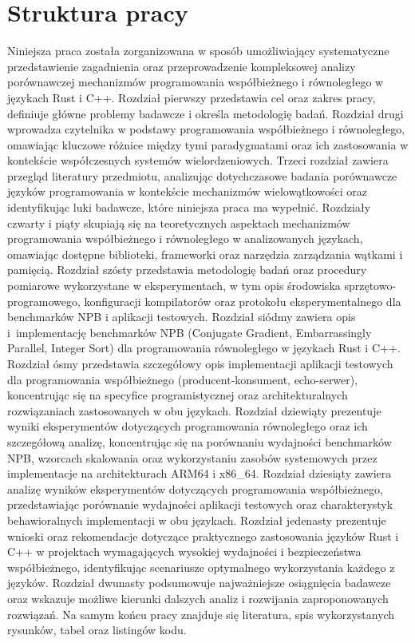 \section{Struktura pracy}
Niniejsza praca została zorganizowana w sposób umożliwiający systematyczne przedstawienie zagadnienia oraz przeprowadzenie kompleksowej analizy porównawczej mechanizmów programowania współbieżnego i równoległego w językach Rust i C++.
Rozdział pierwszy przedstawia cel oraz zakres pracy, definiuje główne problemy badawcze i określa metodologię badań. Rozdział drugi wprowadza czytelnika w podstawy programowania współbieżnego i równoległego, omawiając kluczowe różnice między tymi paradygmatami oraz ich zastosowania w kontekście współczesnych systemów wielordzeniowych. Trzeci rozdział zawiera przegląd literatury przedmiotu, analizując dotychczasowe badania porównawcze języków programowania w kontekście mechanizmów wielowątkowości oraz identyfikując luki badawcze, które niniejsza praca ma wypełnić.
Rozdziały czwarty i piąty skupiają się na teoretycznych aspektach mechanizmów programowania współbieżnego i równoległego w analizowanych językach, omawiając dostępne biblioteki, frameworki oraz narzędzia zarządzania wątkami i pamięcią. Rozdział szósty przedstawia metodologię badań oraz procedury pomiarowe wykorzystane w eksperymentach, w tym opis środowiska sprzętowo-programowego, konfiguracji kompilatorów oraz protokołu eksperymentalnego dla benchmarków NPB i aplikacji testowych. Rozdział siódmy zawiera opis i~implementację benchmarków NPB (Conjugate Gradient, Embarrassingly Parallel, Integer Sort) dla programowania równoległego w językach Rust i C++. Rozdział ósmy przedstawia szczegółowy opis implementacji aplikacji testowych dla programowania współbieżnego (producent-konsument, echo-serwer), koncentrując się na specyfice programistycznej oraz architekturalnych rozwiązaniach zastosowanych w obu językach. Rozdział dziewiąty prezentuje wyniki eksperymentów dotyczących programowania równoległego oraz ich szczegółową analizę, koncentrując się na porównaniu wydajności benchmarków NPB, wzorcach skalowania oraz wykorzystaniu zasobów systemowych przez implementacje na architekturach ARM64 i x86\_64. Rozdział dziesiąty zawiera analizę wyników eksperymentów dotyczących programowania współbieżnego, przedstawiając porównanie wydajności aplikacji testowych oraz charakterystyk behawioralnych implementacji w obu językach.
Rozdział jedenasty prezentuje wnioski oraz rekomendacje dotyczące praktycznego zastosowania języków Rust i C++ w projektach wymagających wysokiej wydajności i bezpieczeństwa współbieżnego, identyfikując scenariusze optymalnego wykorzystania każdego z języków. Rozdział dwunasty podsumowuje najważniejsze osiągnięcia badawcze oraz wskazuje możliwe kierunki dalszych analiz i rozwijania zaproponowanych rozwiązań.
Na samym końcu pracy znajduje się literatura, spis wykorzystanych rysunków, tabel oraz listingów kodu.
